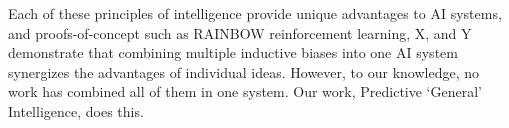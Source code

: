 


    
Each of these principles of intelligence provide unique advantages to AI systems, and proofs-of-concept such as RAINBOW reinforcement learning, X, and Y demonstrate that combining multiple inductive biases into one AI system synergizes the advantages of individual ideas. However, to our knowledge, no work has combined all of them in one system. Our work, Predictive ‘General’ Intelligence, does this. 
